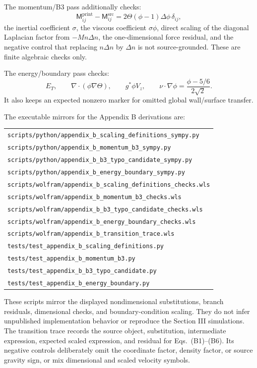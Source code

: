 The momentum/B3 pass additionally checks:
\[
  \mathsf{M}^{\mathrm{print}}_{ij}
  -\mathsf{M}^{\mathrm{src}}_{ij}
  =
  2\Theta(\phi-1)\Delta\phi\,\delta_{ij},
\]
the inertial coefficient \(\sigma\), the viscous coefficient
\(\sigma\phi\), direct scaling of the diagonal Laplacian factor from
\(-Mn\Delta n\), the one-dimensional force residual, and the negative control
that replacing \(n\Delta n\) by \(\Delta n\) is not source-grounded.  These are
finite algebraic checks only.

The energy/boundary pass checks:
\[
  E_T,\qquad \nabla\cdot(\phi\nabla\Theta),\qquad
  g^*\phi V_z,\qquad
  \nu\cdot\nabla\phi=\frac{\phi-5/6}{2\sqrt{2}} .
\]
It also keeps an expected nonzero marker for omitted global wall/surface
transfer.

The executable mirrors for the Appendix B derivations are:
\begin{center}
\small
\begin{tabular}{@{}l@{}}
\texttt{scripts/python/appendix\_b\_scaling\_definitions\_sympy.py}\\
\texttt{scripts/python/appendix\_b\_momentum\_b3\_sympy.py}\\
\texttt{scripts/python/appendix\_b\_b3\_typo\_candidate\_sympy.py}\\
\texttt{scripts/python/appendix\_b\_energy\_boundary\_sympy.py}\\
\texttt{scripts/wolfram/appendix\_b\_scaling\_definitions\_checks.wls}\\
\texttt{scripts/wolfram/appendix\_b\_momentum\_b3\_checks.wls}\\
\texttt{scripts/wolfram/appendix\_b\_b3\_typo\_candidate\_checks.wls}\\
\texttt{scripts/wolfram/appendix\_b\_energy\_boundary\_checks.wls}\\
\texttt{scripts/wolfram/appendix\_b\_transition\_trace.wls}\\
\texttt{tests/test\_appendix\_b\_scaling\_definitions.py}\\
\texttt{tests/test\_appendix\_b\_momentum\_b3.py}\\
\texttt{tests/test\_appendix\_b\_b3\_typo\_candidate.py}\\
\texttt{tests/test\_appendix\_b\_energy\_boundary.py}
\end{tabular}
\end{center}
These scripts mirror the displayed nondimensional substitutions, branch
residuals, dimensional checks, and boundary-condition scaling.  They do not
infer unpublished implementation behavior or reproduce the Section III
simulations.
The transition trace records the source object, substitution, intermediate
expression, expected scaled expression, and residual for Eqs.~(B1)--(B6).  Its
negative controls deliberately omit the coordinate factor, density factor, or
source gravity sign, or mix dimensional and scaled velocity symbols.

